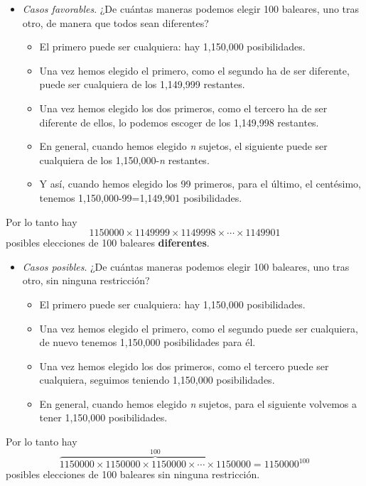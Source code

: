\documentclass[
]{book}
\providecommand{\tightlist}{%
  \setlength{\itemsep}{0pt}\setlength{\parskip}{0pt}}
\theoremstyle{definition}
\theoremstyle{definition}
\theoremstyle{definition}
\theoremstyle{definition}
\theoremstyle{remark}
\begin{document}
\begin{itemize}
\item
  \emph{Casos favorables}. ¿De cuántas maneras podemos elegir 100 baleares, uno tras otro, de manera que todos sean diferentes?

  \begin{itemize}
  \tightlist
  \item
    El primero puede ser cualquiera: hay 1,150,000 posibilidades.
  \item
    Una vez hemos elegido el primero, como el segundo ha de ser diferente, puede ser cualquiera de los 1,149,999 restantes.
  \item
    Una vez hemos elegido los dos primeros, como el tercero ha de ser diferente de ellos, lo podemos escoger de los 1,149,998 restantes.
  \item
    En general, cuando hemos elegido \emph{n} sujetos, el siguiente puede ser cualquiera de los 1,150,000-\emph{n} restantes.
  \item
    Y así, cuando hemos elegido los 99 primeros, para el último, el centésimo, tenemos 1,150,000-99=1,149,901 posibilidades.
  \end{itemize}
\end{itemize}

Por lo tanto hay
\[
1150000\times 1149999\times 1149998\times \cdots\times 1149901
\]
posibles elecciones de 100 baleares \textbf{diferentes}.

\begin{itemize}
\item
  \emph{Casos posibles}. ¿De cuántas maneras podemos elegir 100 baleares, uno tras otro, sin ninguna restricción?

  \begin{itemize}
  \tightlist
  \item
    El primero puede ser cualquiera: hay 1,150,000 posibilidades.
  \item
    Una vez hemos elegido el primero, como el segundo puede ser cualquiera, de nuevo tenemos 1,150,000 posibilidades para él.
  \item
    Una vez hemos elegido los dos primeros, como el tercero puede ser cualquiera, seguimos teniendo 1,150,000 posibilidades.
  \item
    En general, cuando hemos elegido \emph{n} sujetos, para el siguiente volvemos a tener 1,150,000 posibilidades.
  \end{itemize}
\end{itemize}

Por lo tanto hay
\[
\overbrace{1150000\times 1150000\times 1150000\times \cdots\times 1150000}^{100}=1150000^{100}
\]
posibles elecciones de 100 baleares sin ninguna restricción.
\end{document}
